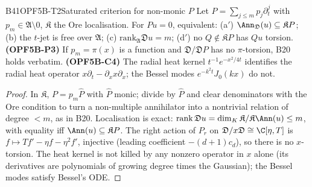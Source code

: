 \begin{dimcard}{B41}{OPF5B-T2}{Saturated criterion for non-monic $P$}{\pw}{}
\label{dim:OPF5B-P3}\label{dim:OPF5B-C4}%
Let $P=\sum_{j\le m}p_j\partial_t^j$ with $p_m\in\mathfrak A\setminus0$, $\mathfrak K$ the Ore localisation. For $Pu=0$, equivalent: (a$'$) $\Ann_{\mathfrak D}(u)\subseteq\mathfrak KP$; (b) the $t$-jet is free over $\mathfrak A$; (c) $\mathrm{rank}_{\mathfrak A}\mathfrak Du=m$; (d$'$) no $Q\notin\mathfrak KP$ has $Qu$ torsion. \textbf{(OPF5B-P3)} If $p_m=\pi(x)$ is a function and $\mathfrak D/\mathfrak DP$ has no $\pi$-torsion, B20 holds verbatim. \textbf{(OPF5B-C4)} The radial heat kernel $t^{-1}e^{-x^2/4t}$ identifies the radial heat operator $x\partial_t-\partial_xx\partial_x$; the Bessel modes $e^{-k^2t}J_0(kx)$ do not.
\end{dimcard}
\begin{proof}
In $\mathfrak K$, $P=p_m\hat P$ with $\hat P$ monic; divide by $\hat P$ and clear denominators with the Ore condition to turn a non-multiple annihilator into a nontrivial relation of degree $<m$, as in B20.
Localisation is exact: $\mathrm{rank}\,\mathfrak Du=\dim_K\mathfrak K/\mathfrak K\Ann(u)\le m$, with equality iff $\Ann(u)\subseteq\mathfrak KP$.
The right action of $P_r$ on $\mathfrak D/x\mathfrak D\cong\C[\eta,T]$ is $f\mapsto Tf'-\eta f-\eta^2f'$, injective (leading coefficient $-(d+1)c_d$), so there is no $x$-torsion. The heat kernel is not killed by any nonzero operator in $x$ alone (its derivatives are polynomials of growing degree times the Gaussian); the Bessel modes satisfy Bessel's ODE.
\end{proof}

